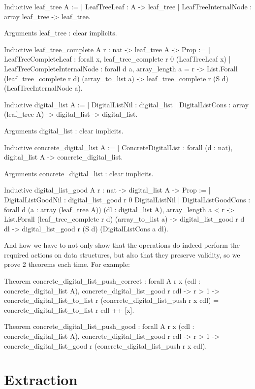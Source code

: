 \documentclass{article}
\begin{document}
\begin{coq}
Inductive leaf_tree {A} :=
  | LeafTreeLeaf : A -> leaf_tree
  | LeafTreeInternalNode : array leaf_tree -> leaf_tree.

Arguments leaf_tree : clear implicits.

Inductive leaf_tree_complete {A} r : nat -> leaf_tree A -> Prop :=
  | LeafTreeCompleteLeaf : forall x, leaf_tree_complete r 0 (LeafTreeLeaf x)
  | LeafTreeCompleteInternalNode :
      forall {d} a,
      array_length a = r ->
      List.Forall (leaf_tree_complete r d) (array_to_list a) ->
      leaf_tree_complete r (S d) (LeafTreeInternalNode a).

Inductive digital_list {A} :=
  | DigitalListNil : digital_list
  | DigitalListCons : array (leaf_tree A) -> digital_list -> digital_list.

Arguments digital_list : clear implicits.

Inductive concrete_digital_list {A} :=
  | ConcreteDigitalList : forall (d : nat), digital_list A -> concrete_digital_list.

Arguments concrete_digital_list : clear implicits.

Inductive digital_list_good {A} r : nat -> digital_list A -> Prop :=
  | DigitalListGoodNil : digital_list_good r 0 DigitalListNil
  | DigitalListGoodCons :
      forall {d} (a : array (leaf_tree A)) (dl : digital_list A),
      array_length a < r ->
      List.Forall (leaf_tree_complete r d) (array_to_list a) ->
      digital_list_good r d dl ->
      digital_list_good r (S d) (DigitalListCons a dl).
\end{coq}

And how we have to not only show that the operations do indeed perform the required actions on data structures, but also that they preserve validity, so we prove 2 theorems each time. For example:

\begin{coq}
Theorem concrete_digital_list_push_correct :
  forall {A} r x (cdl : concrete_digital_list A),
  concrete_digital_list_good r cdl ->
  r > 1 ->
  concrete_digital_list_to_list r (concrete_digital_list_push r x cdl) =
    concrete_digital_list_to_list r cdl ++ [x].

Theorem concrete_digital_list_push_good :
  forall {A} r x (cdl : concrete_digital_list A),
  concrete_digital_list_good r cdl ->
  r > 1 ->
  concrete_digital_list_good r (concrete_digital_list_push r x cdl).
\end{coq}

\section{Extraction}
\end{document}
